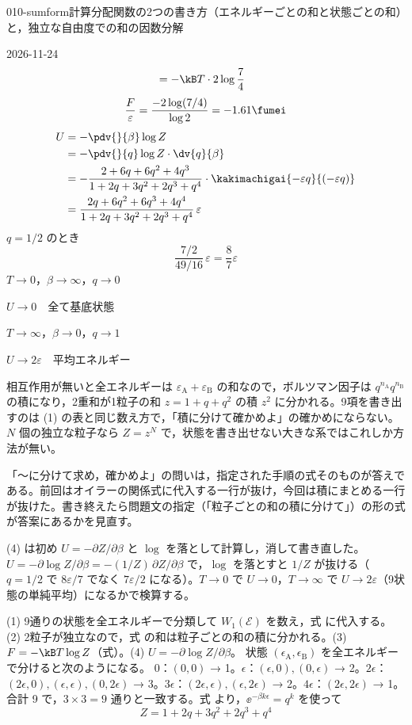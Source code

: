 \documentclass[uplatex,dvipdfmx,a4paper,11pt]{jsarticle}
\begin{document}
\begin{mondai}{010-sumform}{計算}{分配関数の2つの書き方（エネルギーごとの和と状態ごとの和）と，独立な自由度での和の因数分解}
\begin{kotaeutsushi}{2026-11-24}
\begin{align*}
&=-\kB T\cdot2\log\frac{7}{4}
\end{align*}
\[ \frac{F}{\varepsilon}=\frac{-2\log(7/4)}{\log2}=-1.61\fumei \]
\begin{align*}
U&=-\pdv{}{\beta}\log Z\\
&=-\pdv{}{q}\log Z\cdot\dv{q}{\beta}\\
&=-\frac{2+6q+6q^{2}+4q^{3}}{1+2q+3q^{2}+2q^{3}+q^{4}}\cdot\kakimachigai{-\varepsilon q}{(-\varepsilon q)}\\
&=\frac{2q+6q^{2}+6q^{3}+4q^{4}}{1+2q+3q^{2}+2q^{3}+q^{4}}\,\varepsilon
\end{align*}
$q=1/2$ のとき
\[ \frac{7/2}{49/16}\,\varepsilon=\frac{8}{7}\varepsilon \]
$T\to0$，$\beta\to\infty$，$q\to0$

$U\to0$　全て基底状態

$T\to\infty$，$\beta\to0$，$q\to1$

$U\to2\varepsilon$　平均エネルギー
\end{kotaeutsushi}
\begin{kizuki}
\item 相互作用が無いと全エネルギーは $\varepsilon_{\mathrm{A}}+\varepsilon_{\mathrm{B}}$ の和なので，ボルツマン因子は $q^{n_{\mathrm{A}}}q^{n_{\mathrm{B}}}$ の積になり，2重和が1粒子の和 $z=1+q+q^{2}$ の積 $z^{2}$ に分かれる。9項を書き出すのは (1) の表と同じ数え方で，「積に分けて確かめよ」の確かめにならない。$N$ 個の独立な粒子なら $Z=z^{N}$ で，状態を書き出せない大きな系ではこれしか方法が無い。
\item {} 「〜に分けて求め，確かめよ」の問いは，指定された手順の式そのものが答えである。前回はオイラーの関係式に代入する一行が抜け，今回は積にまとめる一行が抜けた。書き終えたら問題文の指定（「粒子ごとの和の積に分けて」）の形の式が答案にあるかを見直す。
\item (4) は初め $U=-\partial Z/\partial\beta$ と $\log$ を落として計算し，消して書き直した。$U=-\partial\log Z/\partial\beta=-(1/Z)\,\partial Z/\partial\beta$ で，$\log$ を落とすと $1/Z$ が抜ける（$q=1/2$ で $8\varepsilon/7$ でなく $7\varepsilon/2$ になる）。$T\to0$ で $U\to0$，$T\to\infty$ で $U\to2\varepsilon$（9状態の単純平均）になるかで検算する。
\end{kizuki}
\begin{tadashii}
\houshin (1) 9通りの状態を全エネルギーで分類して $W_{1}(\mathcal{E})$ を数え，式 に代入する。(2) 2粒子が独立なので，式 の和は粒子ごとの和の積に分かれる。(3) $F=-\kB T\log Z$（式）。(4) $U=-\partial\log Z/\partial\beta$。
\keisan
{} 状態 $(\epsilon_{\mathrm{A}},\epsilon_{\mathrm{B}})$ を全エネルギーで分けると次のようになる。
$0$：$(0,0)$ → 1。$\epsilon$：$(\epsilon,0),(0,\epsilon)$ → 2。$2\epsilon$：$(2\epsilon,0),(\epsilon,\epsilon),(0,2\epsilon)$ → 3。$3\epsilon$：$(2\epsilon,\epsilon),(\epsilon,2\epsilon)$ → 2。$4\epsilon$：$(2\epsilon,2\epsilon)$ → 1。
合計 9 で，$3\times3=9$ 通りと一致する。式 より，$\ee^{-\beta k\epsilon}=q^{k}$ を使って
\[Z=1+2q+3q^{2}+2q^{3}+q^{4}\]


\end{tadashii}
\end{mondai}
\end{document}
